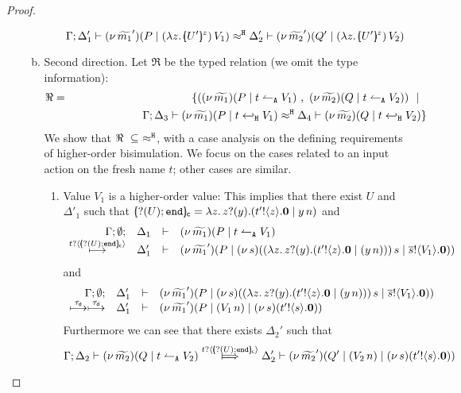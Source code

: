\begin{proof}
\begin{enumerate}[$-$]
\begin{enumerate}[(a)]
\begin{enumerate}[i)]
							\[
								\horel{\Gamma}{\Delta_1'}{\newsp{\widetilde{m_1}'}{P \Par \appl{(\abs{z}{\mapchar{U'}{z}})}{V_1}}}
								{\hwb}
								{\Delta_2'}{\newsp{\widetilde{m_2}'}{Q' \Par \appl{(\abs{z}{\mapchar{U'}{z}})}{V_2}}}
							\]
				\end{enumerate}
		\item	Second direction.
				Let $\Re$ be the typed relation (we omit the type information):
				\begin{eqnarray*}
		\Re &=&	\set{	(\newsp{\widetilde{m_1}}{P \Par \ntrigger{t}{V_1}}\ ,\ 
									\newsp{\widetilde{m_2}}{Q \Par \ntrigger{t}{V_2}}) \setbar\\
						&&
							\qquad \qquad \qquad		\horel{\Gamma}{\Delta_3}{\newsp{\widetilde{m_1}}{P \Par \htrigger{t}{V_1}  } }
									{\hwb}
									{\Delta_4}{\newsp{\widetilde{m_2}}{Q \Par \htrigger{t}{V_2}  } }
					}
				\end{eqnarray*}
				We show that $\Re\ \subseteq\ \hwb$, with a case analysis on the defining requirements
				of higher-order bisimulation.
				We focus on the cases related to an input action on the fresh name $t$; 
				other cases are similar.
				\begin{enumerate}
					\item	Value $V_1$ is a higher-order value: This implies that there exist $U$ and $\Delta'_1$
							such that $[\!\!(? (U) ; \mathtt{end})\!\!]_{\mathsf{c}} = \lambda z.\, z ? (y) . (t' ! \langle z \rangle . \mathbf{0} \;|\; y\, {n})$ and
							\[
								\begin{array}{rcll} \Gamma; \emptyset; &\Delta_1& \vdash& (\nu\, \widetilde{m_1})(P \;|\; t \leftharpoonup_\mathtt{A} V_1  ) \\ \stackrel{t ? \langle [\!\!(? (U) ; \mathtt{end})\!\!]_{\mathsf{c}} \rangle}{\longmapsto} &\Delta_1'& \vdash &  (\nu\, \widetilde{m_1}')(P \;|\; (\nu\, s)( (\lambda z.\, z ? (y) . (t' ! \langle z \rangle . \mathbf{0} \;|\; (y\, {n})))\, {s} \;|\; \overline{s} ! \langle V_1 \rangle . \mathbf{0})) \end{array} 
							\]
														and
							\[
								\begin{array}{rcll} \Gamma; \emptyset; &\Delta_1'& \vdash& (\nu\, \widetilde{m_1}')(P \;|\; (\nu\, s)( (\lambda z.\, z ? (y) . (t' ! \langle z \rangle . \mathbf{0} \;|\; (y\, {n})))\, {s} \;|\; \overline{s} ! \langle V_1 \rangle . \mathbf{0}))\\ \stackrel{\tau_{\mathsf{d}}}{\longmapsto} \stackrel{\tau_{\mathsf{d}}}{\longmapsto} &\Delta_1'& \vdash &  (\nu\, \widetilde{m_1}')(P \;|\; (V_1\, {n}) \;|\; (\nu\, s)(t' ! \langle s \rangle . \mathbf{0})) \end{array}
							\]
							Furthermore we can see that there exists $\Delta_2'$ such that
							\[
								\horel{\Gamma}{\Delta_2}{\newsp{\widetilde{m_2}}{Q \Par \ntrigger{t}{V_2}  } }
								{\Hby{\bactinp{t}{\omapchar{\btinp{U} \tinact}}}}
								{\Delta_2'}{\newsp{\widetilde{m_2}'}{Q' \Par (\appl{V_2}{n}) \Par \newsp{s}{\bout{t'}{s} \inact}}}
							\]

\end{enumerate}
\end{enumerate}
\end{enumerate}
\end{proof}
